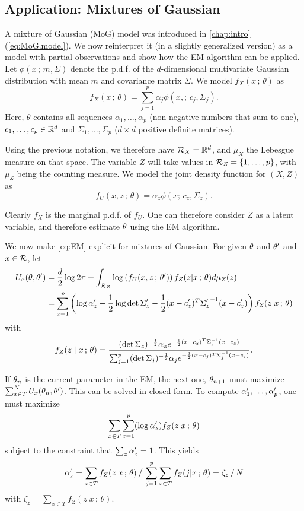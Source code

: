 \subsection{Application: Mixtures of Gaussian}
A mixture of Gaussian (MoG) model was introduced in \cref{chap:intro} (\cref{eq:MoG.model}). We now reinterpret it (in a slightly generalized version) as a model with partial observations and show how the EM algorithm can be applied. Let $\phi(x\,;\, m, \Sigma)$ denote the p.d.f. of the $d$-dimensional multivariate Gaussian distribution with mean $m$ and covariance matrix $\Sigma$. We model $f_X(x\,;\,\theta)$ as
\[
f_X(x\,;\,\theta) = \sum_{j=1}^p \alpha_j \phi(x,;\, c_j, \Sigma_j).
\]
Here, $\theta$ contains all sequences $\alpha_1, \ldots, \alpha_p$ (non-negative numbers that sum to one), $c_1, \ldots, c_p\in {\mathbb{R}}^d$ and $\Sigma_1, \ldots, \Sigma_p$ ($d\times d$ positive definite matrices).

Using the previous notation, we therefore have ${\mathcal R}_X = {\mathbb{R}}^d$, and $\mu_X$ the Lebesgue measure on that space. 
The variable $Z$ will take values in ${\mathcal R}_Z = \{1, \ldots, p\}$, with $\mu_Z$ being the counting measure. We model the joint density function for $(X,Z)$ as
\begin{equation}
\label{eq:mog.lik}
f_U(x,z\,;\,\theta) = \alpha_z \phi(x;\, c_z, \Sigma_z).
\end{equation}

Clearly $f_X$ is the marginal p.d.f. of $f_U$. One can therefore consider $Z$ as a latent variable, and therefore estimate $\theta$ using the EM algorithm.

We now make \cref{eq:EM} explicit for mixtures of Gaussian.
For given $\theta$ and $\theta'$ and $x\in{\mathcal R}$, let
\begin{align*}
U_x(\theta, \theta') &= \frac d2 \log 2\pi + \int_{{\mathcal R}_Z} \log \left(f_U(x,
z\,;\,\theta')\right) f_Z(z|x\,;\,\theta) d\mu_Z(z)  \\
& = \sum_{z=1}^p \left(\log\alpha'_z - \frac{1}{2}
\log\det\Sigma'_z -   \frac12 (x-c'_z)^T{\Sigma'_z}^{-1} (x-c'_z)\right) f_Z(z|x\,;\,\theta) 
\end{align*}
with
\[
f_Z(z\mid x\,;\,\theta) = \frac{(\det \Sigma_z)^{-\frac12} \alpha_z e^{- \frac12
(x-c_z)^T\Sigma_z^{-1} (x-c_z)}}{\sum_{j=1}^p (\det \Sigma_j)^{-\frac12} \alpha_j e^{-\frac12
(x-c_j)^T\Sigma_j^{-1} (x-c_j)}}.
\]

If $\theta_n$ is the current parameter in the EM, the next one, $\theta_{n+1}$ must  maximize
$\sum_{x\in T}^N U_{x}(\theta_n, \theta')$. This can be solved in closed form. To compute $\alpha'_1, \ldots, \alpha'_p$, one must maximize 
\[
\sum_{x\in T}\sum_{z=1}^p (\log\alpha'_z) f_Z(z|x\,;\,\theta)
\]
subject to the constraint that $\sum_z \alpha'_z = 1$. This yields
\[
\alpha'_z = \sum_{x\in T} f_Z(z|x\,;\,\theta)\, \big/ \, \sum_{j=1}^p\sum_{x\in T} f_Z(j|x\,;\,\theta) = \zeta_z\, / \, N
\]
with
$\zeta_z = \sum_{x\in T} f_Z(z|x\,;\,\theta).$

